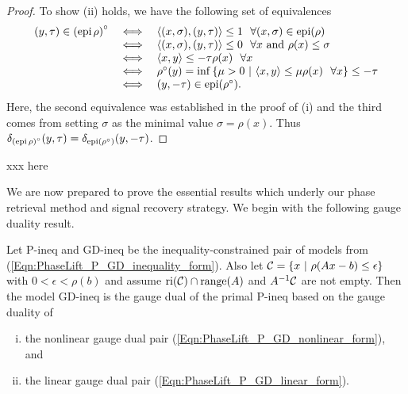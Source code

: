 \begin{proof}
To show (ii) holds, we have the following set of equivalences
\begin{equation*}
\begin{array}{rll}
(y, \tau) \in \left( \epi \halfspace \rho \right)^\circ
	&	\iff	&  \langle (x, \sigma), (y, \tau) \rangle \leq 1 \ \ \forall (x, \sigma) \in  \epi (\rho)
			\\
	&	\iff	&	 \langle (x, \sigma), (y, \tau) \rangle \leq 0 \ \ \forall x \text{ and } \rho(x) \leq \sigma
			\\
	&	\iff	&	\langle x, y \rangle \leq -\tau \rho(x) \ \ \forall x
			\\
	&	\iff	&	\rho^\circ(y) = \inf \left\{ \mu > 0 \ | \ \langle x, y \rangle \leq \mu \rho(x) \ \ \forall x \right\} \leq - \tau
			\\
		&	\iff	&	(y, -\tau)  \in \epi (\rho^\circ).
\end{array}
\end{equation*}
Here, the second equivalence was established in the proof of (i) and the third comes from setting $\sigma$ as the minimal value $\sigma = \rho(x)$.  Thus $\delta_{\left( \textnormal{epi} \hspace{0.05cm} \rho \right)^\circ} (y, \tau) = \delta_{\textnormal{epi} \left( \rho^\circ \right)}(y, -\tau)$.
\end{proof}


xxx here



We are now prepared to prove the essential results which underly our phase retrieval method and signal recovery strategy.  We begin with the following gauge duality result.

\begin{theorem} 				\label{Thm:P-GD-inequality_pair_are_duals}
Let P-ineq and GD-ineq be the inequality-constrained pair of models from (\ref{Eqn:PhaseLift_P_GD_inequality_form}).  Also let ${\mathcal C} = \{ x \ | \ \rho(Ax-b) \leq \epsilon \}$ with $0 < \epsilon < \rho(b)$ and assume $\textnormal{ri}({\mathcal C}) \cap \textnormal{range}(A)$ and $A^{-1}{\mathcal C}$ are not empty.  Then the model GD-ineq is the gauge dual of the primal P-ineq based on the gauge duality of 
\begin{enumerate}[(i)]
\item
the nonlinear gauge dual pair (\ref{Eqn:PhaseLift_P_GD_nonlinear_form}), and
\item
the linear gauge dual pair (\ref{Eqn:PhaseLift_P_GD_linear_form}).
\end{enumerate}
\end{theorem}


